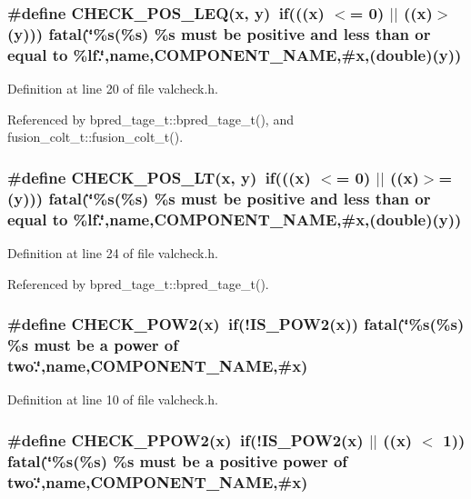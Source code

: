 \subsubsection[{CHECK\_\-POS\_\-LEQ}]{\setlength{\rightskip}{0pt plus 5cm}\#define CHECK\_\-POS\_\-LEQ(x, \/  y)~if(((x) $<$= 0) $|$$|$ ((x)$>$(y))) fatal(\char`\"{}\%s(\%{\bf s}) \%{\bf s} must be positive and less than or equal to \%lf.\char`\"{},name,COMPONENT\_\-NAME,\#x,(double)(y))}\label{valcheck_8h_5d0c5afbebddacc12b87872ae081da05}




Definition at line 20 of file valcheck.h.

Referenced by bpred\_\-tage\_\-t::bpred\_\-tage\_\-t(), and fusion\_\-colt\_\-t::fusion\_\-colt\_\-t().
\subsubsection[{CHECK\_\-POS\_\-LT}]{\setlength{\rightskip}{0pt plus 5cm}\#define CHECK\_\-POS\_\-LT(x, \/  y)~if(((x) $<$= 0) $|$$|$ ((x)$>$=(y))) fatal(\char`\"{}\%s(\%{\bf s}) \%{\bf s} must be positive and less than or equal to \%lf.\char`\"{},name,COMPONENT\_\-NAME,\#x,(double)(y))}\label{valcheck_8h_9aa4fef6ba728b734441f75c59066dac}




Definition at line 24 of file valcheck.h.

Referenced by bpred\_\-tage\_\-t::bpred\_\-tage\_\-t().
\subsubsection[{CHECK\_\-POW2}]{\setlength{\rightskip}{0pt plus 5cm}\#define CHECK\_\-POW2(x)~if(!IS\_\-POW2(x)) fatal(\char`\"{}\%s(\%{\bf s}) \%{\bf s} must be a power of two.\char`\"{},name,COMPONENT\_\-NAME,\#x)}\label{valcheck_8h_de66ba7236859aa51477f42034673fc2}




Definition at line 10 of file valcheck.h.
\subsubsection[{CHECK\_\-PPOW2}]{\setlength{\rightskip}{0pt plus 5cm}\#define CHECK\_\-PPOW2(x)~if(!IS\_\-POW2(x) $|$$|$ ((x) $<$ 1)) fatal(\char`\"{}\%s(\%{\bf s}) \%{\bf s} must be a positive power of two.\char`\"{},name,COMPONENT\_\-NAME,\#x)}\label{valcheck_8h_c99c690e4a721f3296ab6329a6dbaebf}




